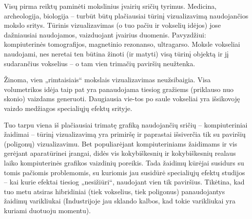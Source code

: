 Visų pirma reiktų paminėti mokslinius įvairių sričių tyrimus. Medicina,
archeologija, biologija -- turbūt būtų plačiausiai tūrinį vizualizavimą
naudojančios mokslo sritys. Tūrinis vizualizavimas (o tuo pačiu ir vokselių
idėjos) jose dažniausiai naudojamos, vaizduojant įvairius duomenis.
Pavyzdžiui: kompiuterinės tomografijos, magnetinio rezonanso, ultragarso.
Moksle vokseliai naudojami, nes neretai ten būtina žinoti (ir matyti) visą
tūrinį objektą ir jį sudarančius vokselius -- o tam vien trimačių paviršių
neužtenka.

Žinoma, vien „rimtaisiais“ mokslais vizualizavimas neužsibaigia. Visa
volumetrikos idėja taip pat yra panaudojama tiesiog gražiems (priklauso nuo
skonio) vaizdams generuoti. Daugiausia vie-tos po saule vokseliai yra
išsikovoję vaizdo medžiagos specialiųjų efektų srityje.

Tuo tarpu viena iš plačiausiai trimatę grafiką naudojančių sričių --
kompiuteriniai žaidimai -- tūrinį vizualizavimą yra primiršę ir paprastai
išsiverčia tik su paviršių (poligonų) vizualizavimu. Bet populiarėjant
kompiuteriniams žaidimams ir vis gerėjant aparatūrinei įrangai, didės vis
kokybiškesnių ir kokybiškesnių realaus laiko kompiuterinės grafikos vaizdinių
poreikis. Tada žaidimų kūrėjai susidurs su tomis pačiomis problemomis, su
kuriomis jau susidūrė specialiųjų efektų studijos -- kai kurie efektai tiesiog
„nesižiūri“, naudojant vien tik paviršius. Tikėtina, kad tuo metu atsiras
hibridiniai (tiek vokselius, tiek poligonus) panaudojantys žaidimų varikliukai
(Industrijoje jau sklando kalbos, kad tokie varikliukai yra kuriami duotuoju
momentu).
